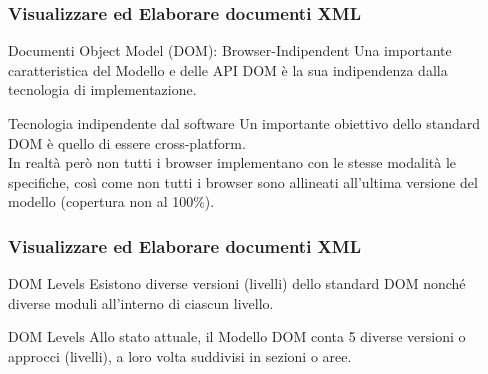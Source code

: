 \begin{frame}
    \frametitle{Visualizzare ed Elaborare documenti XML}
    \addtocounter{nframe}{1}
    

     \begin{block}{Documenti Object Model (DOM): Browser-Indipendent}
        Una importante caratteristica del Modello e delle API DOM è la sua indipendenza dalla tecnologia di implementazione.
        
     \end{block}

     \begin{block}{Tecnologia indipendente dal software}
        Un importante obiettivo dello standard DOM è quello di essere cross-platform. 
        \\In realtà però non tutti i browser implementano con le stesse modalità le specifiche, così come non tutti i browser sono allineati all'ultima versione del modello (copertura non al 100\%).
       
     \end{block}
     
\end{frame}


\begin{frame}
    \frametitle{Visualizzare ed Elaborare documenti XML}
    \addtocounter{nframe}{1}
    

     \begin{block}{DOM Levels}
       Esistono diverse versioni (livelli) dello standard DOM nonché diverse moduli all'interno di ciascun livello.
     \end{block}

     \begin{block}{DOM Levels}
       Allo stato attuale, il Modello DOM conta 5 diverse versioni o approcci (livelli), a loro volta suddivisi in sezioni o aree.
     \end{block}
     
\end{frame}


